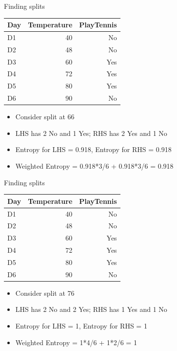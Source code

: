 \documentclass[usenames,dvipsnames]{beamer}
\begin{document}
		\begin{frame}{Finding splits}
			\begin{table}[]
				\begin{tabular}{@{}lrr@{}}
					\toprule
					\textbf{Day} & \textbf{Temperature} & \textbf{PlayTennis} \\ \midrule
					D1           & 40                   & No                  \\
					D2           & 48                   & No                  \\
					D3           & 60                   & Yes                 \\
					D4           & 72                   & Yes                 \\
					D5           & 80                   & Yes                 \\
					D6           & 90                   & No                  \\ \bottomrule
				\end{tabular}
			\end{table}
			\begin{itemize}
				\item Consider split at 66
				\item LHS has 2 No and 1 Yes; RHS has 2 Yes and 1 No
				\item Entropy for LHS = 0.918, Entropy for RHS = 0.918
				\item Weighted Entropy = 0.918*3/6 + 0.918*3/6 = 0.918
			\end{itemize}
			\end{frame}


		\begin{frame}{Finding splits}
			\begin{table}[]
				\begin{tabular}{@{}lrr@{}}
					\toprule
					\textbf{Day} & \textbf{Temperature} & \textbf{PlayTennis} \\ \midrule
					D1           & 40                   & No                  \\
					D2           & 48                   & No                  \\
					D3           & 60                   & Yes                 \\
					D4           & 72                   & Yes                 \\
					D5           & 80                   & Yes                 \\
					D6           & 90                   & No                  \\ \bottomrule
				\end{tabular}
			\end{table}
			\begin{itemize}
				\item Consider split at 76
				\item LHS has 2 No and 2 Yes; RHS has 1 Yes and 1 No
				\item Entropy for LHS = 1, Entropy for RHS = 1
				\item Weighted Entropy = 1*4/6 + 1*2/6 = 1
			\end{itemize}
			\end{frame}
\end{document}
